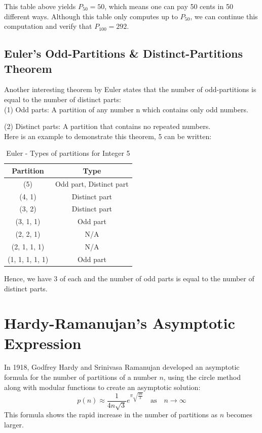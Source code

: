 \documentclass{article}
\theoremstyle{definition}
\theoremstyle{question}
\begin{document}
\noindent  This table above yields $P_{50} = 50$, which means one can pay 50 cents in 50 different ways. Although this table only computes up to $P_{50}$, we can continue this computation and verify that $P_{100} = 292$.


\newpage
\subsection{Euler's Odd-Partitions \& Distinct-Partitions Theorem}
Another interesting theorem by Euler states that the number of odd-partitions is equal to the number of distinct parts:\\

\noindent (1) Odd parts: A partition of any number n which contains only odd numbers.

\noindent (2) Distinct parts: A partition that contains no repeated numbers. \\

\noindent Here is an example to demonstrate this theorem, 5 can be written:
\begin{table}[h]
    \centering 
    \begin{tabular}{|c|c|}
    \hline
    Partition & Type \\
    \hline
    (5) & Odd part, Distinct part \\
    (4, 1) & Distinct part \\
    (3, 2) & Distinct part \\
    (3, 1, 1) & Odd part \\
    (2, 2, 1) & N/A \\
    (2, 1, 1, 1) & N/A \\
    (1, 1, 1, 1, 1) & Odd part \\
    \hline
    \end{tabular}
    \caption{Euler - Types of partitions for Integer 5}
\end{table}
    
\noindent Hence, we have 3 of each and the number of odd parts is equal to the number of distinct parts.

\newpage
\section{Hardy-Ramanujan’s Asymptotic Expression}
In 1918, Godfrey Hardy and Srinivasa Ramanujan developed an asymptotic formula for the number of partitions of a number \( n\), using the circle method along with modular functions to create an asymptotic solution:
\[
p(n) \approx \frac{1}{4n\sqrt{3}} e^{\pi \sqrt{\frac{2n}{3}}} \quad \text{as} \quad n \to \infty
\]
This formula shows the rapid increase in the number of partitions as \( n \) becomes larger.\\
\end{document}

